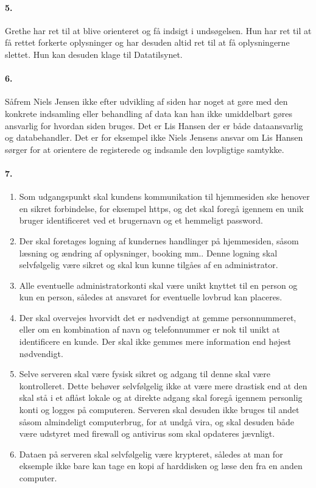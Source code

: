 \paragraph{5.} Grethe har ret til at blive orienteret og få indsigt i
undsøgelsen. Hun har ret til at få rettet forkerte oplysninger og har desuden
altid ret til at få oplysningerne slettet. Hun kan desuden klage til
Datatilsynet.

\paragraph{6.}
Såfrem Niels Jensen ikke efter udvikling af siden har noget at gøre med den
konkrete indsamling eller behandling af data kan han ikke umiddelbart gøres
ansvarlig for hvordan siden bruges. Det er Lis Hansen der er både dataansvarlig og
databehandler. Det er for eksempel ikke Niels Jensens ansvar om Lis Hansen
sørger for at orientere de registerede og indsamle den lovpligtige samtykke.

\paragraph{7.}
\begin{enumerate}
\item Som udgangspunkt skal kundens kommunikation til hjemmesiden ske henover en
sikret forbindelse, for eksempel https, og det skal foregå igennem en unik
bruger identificeret ved et brugernavn og et hemmeligt password.
\item Der skal foretages logning af kundernes handlinger på hjemmesiden, såsom
læsning og ændring af oplysninger, booking mm.. Denne logning skal selvfølgelig
være sikret og skal kun kunne tilgåes af en administrator.
\item Alle eventuelle administratorkonti skal være unikt knyttet til en person
og kun en person, således at ansvaret for eventuelle lovbrud kan placeres.
\item Der skal overvejes hvorvidt det er nødvendigt at gemme personnummeret,
eller om en kombination af navn og telefonnummer er nok til unikt at identificere
en kunde. Der skal ikke gemmes mere information end højest nødvendigt.
\item Selve serveren skal være fysisk sikret og adgang til denne skal være kontrolleret.
Dette behøver selvfølgelig ikke at være mere drastisk end at den skal stå i et aflåst
lokale og at direkte adgang skal foregå igennem personlig konti og logges på computeren.
Serveren skal desuden ikke bruges til andet såsom almindeligt computerbrug, for at undgå vira,
og skal desuden både være udstyret med firewall og antivirus som skal opdateres jævnligt.
\item Dataen på serveren skal selvfølgelig være krypteret, således at man for eksemple ikke
bare kan tage en kopi af harddisken og læse den fra en anden computer.
\end{enumerate}

